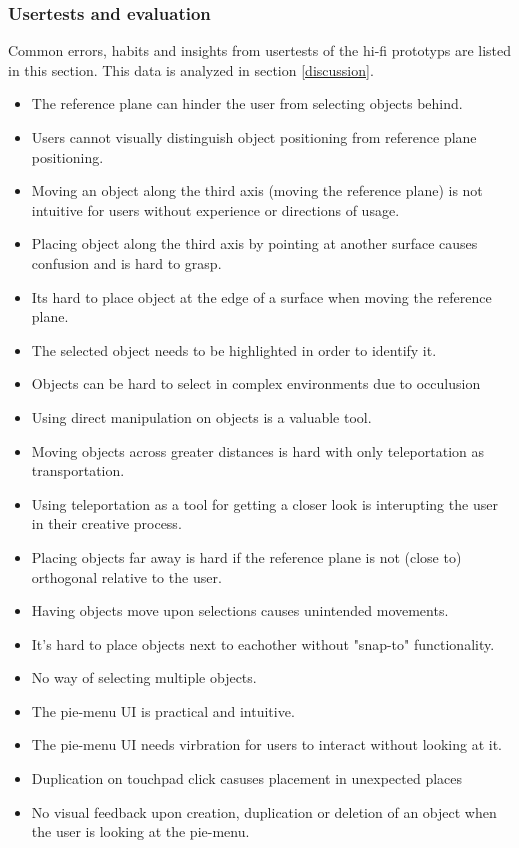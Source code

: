 \subsubsection{Usertests and evaluation}
Common errors, habits and insights from usertests of the hi-fi prototyps are listed in this section. This data is analyzed in section \ref{discussion}.

\begin{itemize}

  \item The reference plane can hinder the user from selecting objects behind.
  \item Users cannot visually distinguish object positioning from reference plane positioning.
  \item Moving an object along the third axis (moving the reference plane) is not intuitive for users without experience or directions of usage.
  \item Placing object along the third axis by pointing at another surface causes confusion and is hard to grasp.
  \item Its hard to place object at the edge of a surface when moving the reference plane.

  \item The selected object needs to be highlighted in order to identify it.
  \item Objects can be hard to select in complex environments due to occulusion
  \item Using direct manipulation on objects is a valuable tool.
  \item Moving objects across greater distances is hard with only teleportation as transportation.
  \item Using teleportation as a tool for getting a closer look is interupting the user in their creative process.
  \item Placing objects far away is hard if the reference plane is not (close to) orthogonal relative to the user.
  \item Having objects move upon selections causes unintended movements.
  \item It's hard to place objects next to eachother without "snap-to" functionality.
  \item No way of selecting multiple objects.

  \item The pie-menu UI is practical and intuitive.
  \item The pie-menu UI needs virbration for users to interact without looking at it.
  \item Duplication on touchpad click casuses placement in unexpected places
  \item No visual feedback upon creation, duplication or deletion of an object when the user is looking at the pie-menu.


\end{itemize}
